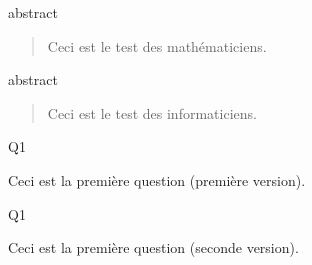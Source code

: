 \documentclass[12pt,a4paper, no-auto-maketitle]{tests}
\begin{document}
\begin{namequestion}{abstract}
  \begin{abstract}
    Ceci est le test des mathématiciens.
  \end{abstract}
\end{namequestion}
\begin{namequestion}{abstract}
  \begin{abstract}
    Ceci est le test des informaticiens.
  \end{abstract}
\end{namequestion}

\begin{namequestion}{Q1}
  \begin{question}
    Ceci est la première question (première version).
  \end{question}
\end{namequestion}
\begin{namequestion}{Q1}
  \begin{question}
    Ceci est la première question (seconde version).
  \end{question}
\end{namequestion}


\end{document}
